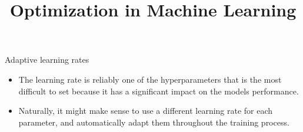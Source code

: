 \documentclass[11pt,compress,t,notes=noshow, xcolor=table]{beamer}
\title{Optimization in Machine Learning}
\date{}
\begin{document}
\sloppy

\begin{vbframe}{Adaptive learning rates}
	\begin{itemize}
		\item The learning rate is reliably one of the hyperparameters that is the most difficult to set because it has a significant impact on the models performance.
		\item Naturally, it might make sense to use a different learning rate for each parameter, and automatically adapt them throughout the training process.
	\end{itemize}
\end{vbframe}
\end{document}
